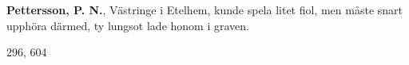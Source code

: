 \textbf{Pettersson, P. N.}, Västringe i Etelhem, kunde spela litet fiol, men måste snart upphöra därmed,
ty lungsot lade honom i graven.

296, 604 
